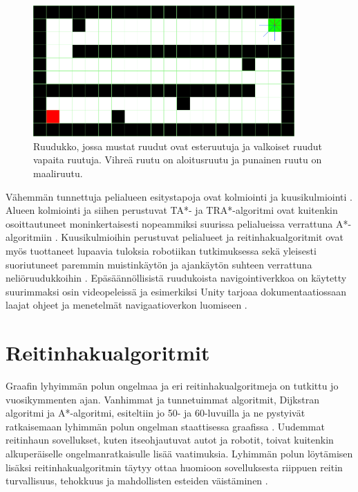 \documentclass[utf8]{gradu3}
\begin{document}
\begin{figure}[h]
\centering
\includegraphics[width=10cm]{ruudukko_kuva.png}
\caption{Ruudukko, jossa mustat ruudut ovat esteruutuja ja valkoiset ruudut vapaita ruutuja. Vihreä ruutu on aloitusruutu ja punainen ruutu on maaliruutu.}
\label{ruudukkokuva}
\end{figure}

Vähemmän tunnettuja pelialueen esitystapoja ovat kolmiointi ja kuusikulmiointi \parencite{abd2015comprehensive}. Alueen kolmiointi ja siihen perustuvat TA*- ja TRA*-algoritmi ovat kuitenkin osoittautuneet moninkertaisesti nopeammiksi suurissa pelialueissa verrattuna A*-algoritmiin \parencite{demyen2006efficient}. Kuusikulmioihin perustuvat pelialueet ja reitinhakualgoritmit ovat myös tuottaneet lupaavia tuloksia robotiikan tutkimuksessa sekä yleisesti suoriutuneet paremmin muistinkäytön ja ajankäytön suhteen verrattuna neliöruudukkoihin \parencite{abd2015comprehensive,lawande2022systematic}. Epäsäännöllisistä ruudukoista navigointiverkkoa on käytetty suurimmaksi osin videopeleissä ja esimerkiksi Unity tarjoaa dokumentaatiossaan laajat ohjeet ja menetelmät navigaatioverkon luomiseen \parencite{lawande2022systematic,unitydocnavmesh}.

\section{Reitinhakualgoritmit}

Graafin lyhyimmän polun ongelmaa ja eri reitinhakualgoritmeja on tutkittu jo vuosikymmenten ajan. Vanhimmat ja tunnetuimmat algoritmit, Dijkstran algoritmi ja A*-algoritmi, esiteltiin jo 50- ja 60-luvuilla ja ne pystyivät ratkaisemaan lyhimmän polun ongelman staattisessa graafissa \parencite{dijkstra1959note,hart1968formal} . Uudemmat reitinhaun sovellukset, kuten itseohjautuvat autot ja robotit, toivat kuitenkin alkuperäiselle ongelmanratkaisulle lisää vaatimuksia. Lyhimmän polun löytämisen lisäksi reitinhakualgoritmin täytyy ottaa huomioon sovelluksesta riippuen reitin turvallisuus, tehokkuus ja mahdollisten esteiden väistäminen \parencite{karur2021survey}.
\end{document}
